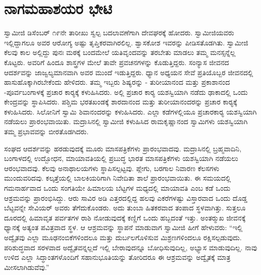 
\chapter{ನಾಗಮಹಾಶಯರ ಭೇಟಿ }

\vskip 3pt

 ಸ್ವಾಮೀಜಿ ಡಿಸೆಂಬರ್ ೧೯ನೇ ತಾರೀಖು ಸ್ವಲ್ಪ ಬದಲಾವಣೆಗಾಗಿ ದೇವಘರಕ್ಕೆ ಹೋದರು. ಸ್ವಾಮೀಜಿಯವರು ಇಲ್ಲಿದ್ದಾಗಲೂ ಅವರ ಆರೋಗ್ಯ ಅಷ್ಟು ತೃಪ್ತಿಕರವಾಗಿರಲಿಲ್ಲ. ಶ್ವಾಸಕೋಶ ಇವರನ್ನು ಪೀಡಿಸತೊಡಗಿತು. ಸ್ವಾಮೀಜಿ ಕೆಲವು ಕಾಲ ಅಲ್ಲಿದ್ದು ಪುನಃ ಮಠಕ್ಕೆ ಬಂದಮೇಲೆ ಯತಿವೃಂದವನ್ನು ತರಬೇತು ಮಾಡಲು ತಮ್ಮ ಮನಸ್ಸನ್ನೆಲ್ಲ ಕೊಟ್ಟರು. ಅವರಿಗೆ ಹಿಂದೂ ಶಾಸ್ತ್ರಗಳ ಮೇಲೆ ತಾವೇ ಪ್ರವಚನಗಳನ್ನು ಕೊಡುತ್ತಿದ್ದರು. ಸಂನ್ಯಾಸ ಜೀವನದ ಆದರ್ಶವನ್ನು ಜಾಜ್ವಲ್ಯಮಾನವಾಗಿ ಅವರ ಮುಂದೆ ಇಡುತ್ತಿದ್ದರು. ಧ್ಯಾನ ಅಧ್ಯಯನ ಸೇವೆ ಪ್ರತಿಯೊಬ್ಬರ ಜೀವನದಲ್ಲಿ ಹಾಸುಹೊಕ್ಕಾಗಿರಬೇಕೆಂದು ಹೇಳಿದರು. ತಮ್ಮ ಇಬ್ಬರು ಶಿಷ್ಯರನ್ನು - ತುರೀಯಾನಂದ ಮತ್ತು ಪ್ರಕಾಶಾನಂದ -ಪೂರ್ವಬಂಗಾಳಕ್ಕೆ ಪ್ರಚಾರ ಕಾರ‍್ಯಕ್ಕೆ ಕಳುಹಿಸಿದರು. ಅಲ್ಲಿ ಪ್ರಚಾರ ಕಾರ‍್ಯ ಯಶಸ್ವಿಯಾಗಿ ನಡೆದು ಢಾಕಾದಲ್ಲಿ ಒಂದು ಕೇಂದ್ರವನ್ನು ಸ್ಥಾಪಿಸಿದರು. ಪಶ್ಚಿಮ ಭರತಖಂಡಕ್ಕೆ ಶಾರದಾನಂದ ಮತ್ತು ತುರೀಯಾನಂದರನ್ನು ಪ್ರಚಾರ ಕಾರ‍್ಯಕ್ಕೆ ಕಳುಹಿಸಿದರು. ಸಿಲೋನಿಗೆ ಸ್ವಾಮಿ ಶಿವಾನಂದರನ್ನು ಕಳುಹಿಸಿದರು. ಎಲ್ಲಾ ಕಡೆಗಳಲ್ಲಿಯೂ ಪ್ರಚಾರಕಾರ‍್ಯ ಯಶಸ್ವಿಯಾಗಿ ನಡೆಯಲು ಪ್ರಾರಂಭವಾಯಿತು. ಮದ್ರಾಸಿನಲ್ಲಿ ಸ್ವಾಮೀಜಿ ಕಳುಹಿಸಿದ ರಾಮಕೃಷ್ಣಾನಂದ ಸ್ವಾಮಿಗಳು ಯಶಸ್ವಿಯಾಗಿ ತಮ್ಮ ಪ್ರಭಾವವನ್ನು ಬೀರತೊಡಗಿದರು. 

\vskip 3pt

 ಸಂಘದ ಆದರ್ಶವನ್ನು ಹರಡುವುದಕ್ಕೆ ಮೂರು ಮಾಸಪತ್ರಿಕೆಗಳು ಪ್ರಾರಂಭವಾದವು. ಮದ್ರಾಸಿನಲ್ಲಿ ಬ್ರಹ್ಮವಾದಿನಿ, ಬಂಗಾಳದಲ್ಲಿ ಉದ್ಬೋಧನ, ಮಾಯಾವತಿಯಲ್ಲಿ ಪ್ರಬುದ್ಧ ಭಾರತ ಮಾಸಪತ್ರಿಕೆಗಳು ಯಶಸ್ವಿಯಾಗಿ ನಡೆಯಲು ಆರಂಭವಾದವು. ಕೆಲವು ಅನಾಥಾಲಯಗಳು ಸ್ಥಾಪಿಸಲ್ಪಟ್ಟವು. ಪ್ಲೇಗು, ಬರಗಾಲ ನಿವಾರಣ ಕೆಲಸಗಳು ಮುಂದುವರಿದವು. ಕಲ್ಕತ್ತೆಯಲ್ಲಿ ಬಾಲಕಿಯರಿಗಾಗಿ ನಿವೇದಿತಾ ಶಾಲೆ ಪ್ರಾರಂಭವಾಯಿತು. ಈ ಸಮಯದಲ್ಲಿ ಗಮನಾರ್ಹವಾದ ಒಂದು ಸಂಗತಿಯೇ ಹಿಮಾಲಯ ಬೆಟ್ಟಗಳ ಮಧ್ಯದಲ್ಲಿ ಮಾಯಾವತಿ ಎಂಬ ಕಡೆ ಒಂದು ಆಶ್ರಮವನ್ನು ಪ್ರಾರಂಭಿಸಿದ್ದು. ಆರು ಸಾವಿರ ಅಡಿ ಎತ್ತರದಲ್ಲಿದ್ದ ಹಲವು ಎಕರೆಗಳಷ್ಟು ವಿಸ್ತಾರವಾದ ಒಂದು ದೊಡ್ಡ ಬೆಟ್ಟವನ್ನೇ ಸೇವಿಯರ್ ಅವರು ತೆಗೆದುಕೊಂಡರು. ಅದು ತುಂಬಾ ಹಿತಕರವಾದ ತಂಪಾದ ಸ್ಥಳವಾಗಿತ್ತು. ಸುತ್ತಲೂ ದೂರದಲ್ಲಿ ಹಿಮಾವೃತ ಪರ್ವತಗಳ ರಾಶಿ ನೋಡುವುದಕ್ಕೆ ಕಣ್ಣಿಗೆ ಒಂದು ಹಬ್ಬದಂತೆ ಇತ್ತು. ಅಂತರ‍್ಮುಖ ಜೀವನಕ್ಕೆ ಧ್ಯಾನಕ್ಕೆ ಅತ್ಯಂತ ಪವಿತ್ರವಾದ ಸ್ಥಳ. ಆ ಆಶ್ರಮವನ್ನು ಸ್ಥಾಪನೆ ಮಾಡುವಾಗ ಸ್ವಾಮೀಜಿ ಹೀಗೆ ಹೇಳುವರು: “ಇಲ್ಲಿ ಅದ್ವೈತವು ಎಲ್ಲಾ ಮೂಢನಂಬಿಕೆಗಳಿಂದಲೂ ಮತ್ತು ದುರ್ಬಲಗೊಳಿಸುವ ಮಿಶ್ರಣಗಳಿಂದಲೂ ರಕ್ಷಿಸಲ್ಪಡುವುದು. ಪರಿಶುದ್ಧವಾದ ಸರಳವಾದ ಅದ್ವೈತವನ್ನಲ್ಲದೆ ಇಲ್ಲಿ ಬೇರಾವುದನ್ನೂ ಬೋಧಿಸುವುದಿಲ್ಲ, ಅಭ್ಯಾಸ ಮಾಡುವುದಿಲ್ಲ. ನಾವು ಉಳಿದ ಎಲ್ಲಾ ಸಿದ್ಧಾಂತಗಳೊಂದಿಗೆ ಸಹಾನುಭೂತಿಯನ್ನು ತೋರಿದರೂ ಈ ಆಶ್ರಮವನ್ನು ಅದ್ವೈತಕ್ಕೆ ಮಾತ್ರ ಮೀಸಲಾಗಿಡುವೆವು.” 

